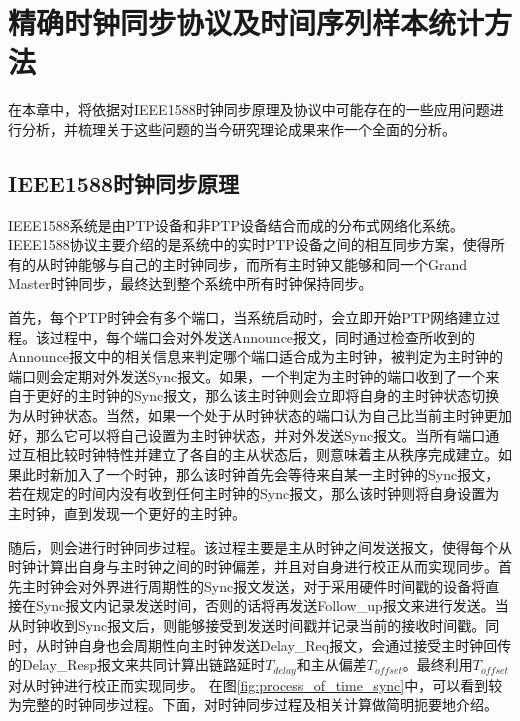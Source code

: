 
\chapter{精确时钟同步协议及时间序列样本统计方法}
\label{chap:1588_theory}
在本章中，将依据对IEEE1588时钟同步原理及协议中可能存在的一些应用问题进行分析，并梳理关于这些问题的当今研究理论成果来作一个全面的分析。

\section{IEEE1588时钟同步原理}
IEEE1588系统是由PTP设备和非PTP设备结合而成的分布式网络化系统。IEEE1588协议主要介绍的是系统中的实时PTP设备之间的相互同步方案，使得所有的从时钟能够与自己的主时钟同步，而所有主时钟又能够和同一个Grand Master时钟同步，最终达到整个系统中所有时钟保持同步。

首先，每个PTP时钟会有多个端口，当系统启动时，会立即开始PTP网络建立过程。该过程中，每个端口会对外发送Announce报文，同时通过检查所收到的Announce报文中的相关信息来判定哪个端口适合成为主时钟，被判定为主时钟的端口则会定期对外发送Sync报文。如果，一个判定为主时钟的端口收到了一个来自于更好的主时钟的Sync报文，那么该主时钟则会立即将自身的主时钟状态切换为从时钟状态。当然，如果一个处于从时钟状态的端口认为自己比当前主时钟更加好，那么它可以将自己设置为主时钟状态，并对外发送Sync报文。当所有端口通过互相比较时钟特性并建立了各自的主从状态后，则意味着主从秩序完成建立。如果此时新加入了一个时钟，那么该时钟首先会等待来自某一主时钟的Sync报文，若在规定的时间内没有收到任何主时钟的Sync报文，那么该时钟则将自身设置为主时钟，直到发现一个更好的主时钟。

随后，则会进行时钟同步过程。该过程主要是主从时钟之间发送报文，使得每个从时钟计算出自身与主时钟之间的时钟偏差，并且对自身进行校正从而实现同步。首先主时钟会对外界进行周期性的Sync报文发送，对于采用硬件时间戳的设备将直接在Sync报文内记录发送时间，否则的话将再发送Follow\_up报文来进行发送。当从时钟收到Sync报文后，则能够接受到发送时间戳并记录当前的接收时间戳。同时，从时钟自身也会周期性向主时钟发送Delay\_Req报文，会通过接受主时钟回传的Delay\_Resp报文来共同计算出链路延时$T_{delay}$和主从偏差$T_{offset}$。最终利用$T_{offset}$对从时钟进行校正而实现同步。
\label{sec:1588_theory_sync}
在图\ref{fig:process_of_time_sync}中，可以看到较为完整的时钟同步过程。下面，对时钟同步过程及相关计算做简明扼要地介绍。

